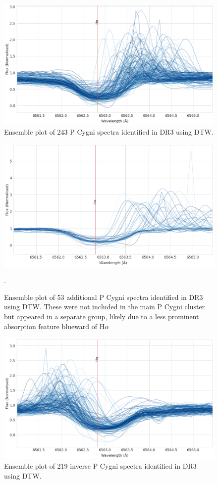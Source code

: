 \begin{figure}[!htb]
\centering
\includegraphics[scale=0.45]{figures/p cygni ensemble.png}
\caption{Ensemble plot of 243 P Cygni spectra identified in DR3 using DTW.}
\end{figure}

\begin{figure}[!htb]
\centering
\includegraphics[scale=0.45]{figures/p cugni 2.png}
\caption{Ensemble plot of 53 additional P Cygni spectra identified in DR3 using DTW. These were not included in the main P Cygni cluster but appeared in a separate group, likely due to a less prominent absorption feature blueward of H$\alpha$}.
\end{figure}

\begin{figure}[!htb]
\centering
\includegraphics[scale=0.45]{figures/inverse p cygni ensemble.png}
\caption{Ensemble plot of 219 inverse P Cygni spectra identified in DR3 using DTW.}
\end{figure}

